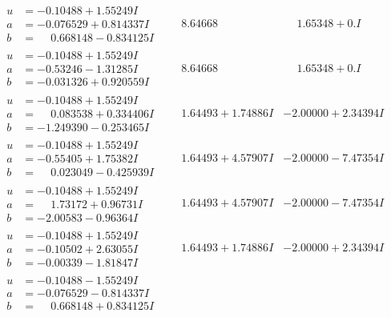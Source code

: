 \documentclass[1p]{elsarticle_modified}
\theoremstyle{definition}
\begin{document}
$$\begin{array}{c|c|c}
\begin{aligned}
u &= -0.10488 + 1.55249 I \\
a &= -0.076529 + 0.814337 I \\
b &= \phantom{-}0.668148 - 0.834125 I\end{aligned}
 & \phantom{-}8.64668\phantom{ +0.000000I} & \phantom{-}1.65348 + 0. I\phantom{ +0.000000I} \\ \hline\begin{aligned}
u &= -0.10488 + 1.55249 I \\
a &= -0.53246 - 1.31285 I \\
b &= -0.031326 + 0.920559 I\end{aligned}
 & \phantom{-}8.64668\phantom{ +0.000000I} & \phantom{-}1.65348 + 0. I\phantom{ +0.000000I} \\ \hline\begin{aligned}
u &= -0.10488 + 1.55249 I \\
a &= \phantom{-}0.083538 + 0.334406 I \\
b &= -1.249390 - 0.253465 I\end{aligned}
 & \phantom{-}1.64493 + 1.74886 I & -2.00000 + 2.34394 I \\ \hline\begin{aligned}
u &= -0.10488 + 1.55249 I \\
a &= -0.55405 + 1.75382 I \\
b &= \phantom{-}0.023049 - 0.425939 I\end{aligned}
 & \phantom{-}1.64493 + 4.57907 I & -2.00000 - 7.47354 I \\ \hline\begin{aligned}
u &= -0.10488 + 1.55249 I \\
a &= \phantom{-}1.73172 + 0.96731 I \\
b &= -2.00583 - 0.96364 I\end{aligned}
 & \phantom{-}1.64493 + 4.57907 I & -2.00000 - 7.47354 I \\ \hline\begin{aligned}
u &= -0.10488 + 1.55249 I \\
a &= -0.10502 + 2.63055 I \\
b &= -0.00339 - 1.81847 I\end{aligned}
 & \phantom{-}1.64493 + 1.74886 I & -2.00000 + 2.34394 I \\ \hline\begin{aligned}
u &= -0.10488 - 1.55249 I \\
a &= -0.076529 - 0.814337 I \\
b &= \phantom{-}0.668148 + 0.834125 I\end{aligned}

\end{array}$$
\end{document}
